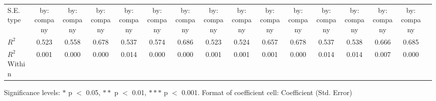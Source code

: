 \begin{threeparttable}
\begin{tabular}{lccccccccccccccc}
S.E. type & by: company & by: company & by: company & by: company & by: company & by: company & by: company & by: company & by: company & by: company & by: company & by: company & by: company & by: company \\
$R^2$ & 0.523 & 0.558 & 0.678 & 0.537 & 0.574 & 0.686 & 0.523 & 0.524 & 0.657 & 0.678 & 0.537 & 0.538 & 0.666 & 0.685 \\
$R^2$ Within & 0.001 & 0.000 & 0.000 & 0.014 & 0.000 & 0.000 & 0.001 & 0.001 & 0.001 & 0.000 & 0.014 & 0.014 & 0.007 & 0.000 \\
\bottomrule
\end{tabular}
\footnotesize Significance levels: $*$ p $<$ 0.05, $**$ p $<$ 0.01, $***$ p $<$ 0.001. Format of coefficient cell: Coefficient 
 (Std. Error)
\end{threeparttable}